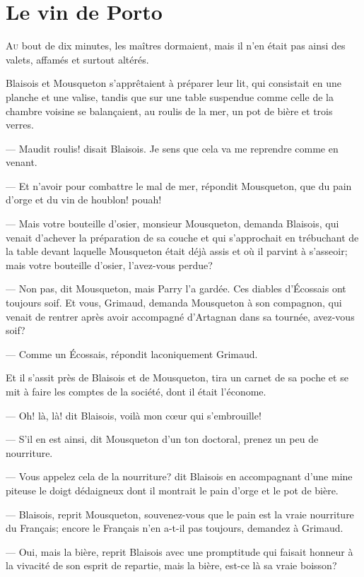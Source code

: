 \chapter{Le vin de Porto}

\lettrine{A}{u} bout de dix minutes, les maîtres dormaient, mais il n'en était pas ainsi des valets, affamés et surtout altérés.

\zz
Blaisois et Mousqueton s'apprêtaient à préparer leur lit, qui consistait en une planche et une valise, tandis que sur une table suspendue comme celle de la chambre voisine se balançaient, au roulis de la mer, un pot de bière et trois verres.

— Maudit roulis! disait Blaisois. Je sens que cela va me reprendre comme en venant.

— Et n'avoir pour combattre le mal de mer, répondit Mousqueton, que du pain d'orge et du vin de houblon! pouah!

— Mais votre bouteille d'osier, monsieur Mousqueton, demanda Blaisois, qui venait d'achever la préparation de sa couche et qui s'approchait en trébuchant de la table devant laquelle Mousqueton était déjà assis et où il parvint à s'asseoir; mais votre bouteille d'osier, l'avez-vous perdue?

— Non pas, dit Mousqueton, mais Parry l'a gardée. Ces diables d'Écossais ont toujours soif. Et vous, Grimaud, demanda Mousqueton à son compagnon, qui venait de rentrer après avoir accompagné d'Artagnan dans sa tournée, avez-vous soif?

— Comme un Écossais, répondit laconiquement Grimaud.

Et il s'assit près de Blaisois et de Mousqueton, tira un carnet de sa poche et se mit à faire les comptes de la société, dont il était l'économe.

— Oh! là, là! dit Blaisois, voilà mon cœur qui s'embrouille!

— S'il en est ainsi, dit Mousqueton d'un ton doctoral, prenez un peu de nourriture.

— Vous appelez cela de la nourriture? dit Blaisois en accompagnant d'une mine piteuse le doigt dédaigneux dont il montrait le pain d'orge et le pot de bière.

— Blaisois, reprit Mousqueton, souvenez-vous que le pain est la vraie nourriture du Français; encore le Français n'en a-t-il pas toujours, demandez à Grimaud.

— Oui, mais la bière, reprit Blaisois avec une promptitude qui faisait honneur à la vivacité de son esprit de repartie, mais la bière, est-ce là sa vraie boisson?

